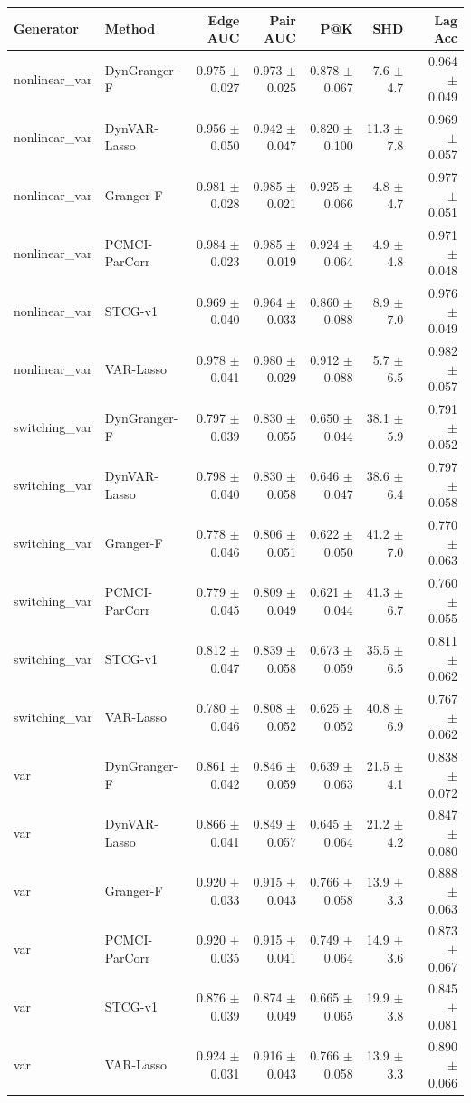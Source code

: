 \begin{tabular}{llrrrrr}
\toprule
Generator & Method & Edge AUC & Pair AUC & P@K & SHD & Lag Acc \\
\midrule
nonlinear_var & DynGranger-F & 0.975 $\pm$ 0.027 & 0.973 $\pm$ 0.025 & 0.878 $\pm$ 0.067 & 7.6 $\pm$ 4.7 & 0.964 $\pm$ 0.049 \\
nonlinear_var & DynVAR-Lasso & 0.956 $\pm$ 0.050 & 0.942 $\pm$ 0.047 & 0.820 $\pm$ 0.100 & 11.3 $\pm$ 7.8 & 0.969 $\pm$ 0.057 \\
nonlinear_var & Granger-F & 0.981 $\pm$ 0.028 & 0.985 $\pm$ 0.021 & 0.925 $\pm$ 0.066 & 4.8 $\pm$ 4.7 & 0.977 $\pm$ 0.051 \\
nonlinear_var & PCMCI-ParCorr & 0.984 $\pm$ 0.023 & 0.985 $\pm$ 0.019 & 0.924 $\pm$ 0.064 & 4.9 $\pm$ 4.8 & 0.971 $\pm$ 0.048 \\
nonlinear_var & STCG-v1 & 0.969 $\pm$ 0.040 & 0.964 $\pm$ 0.033 & 0.860 $\pm$ 0.088 & 8.9 $\pm$ 7.0 & 0.976 $\pm$ 0.049 \\
nonlinear_var & VAR-Lasso & 0.978 $\pm$ 0.041 & 0.980 $\pm$ 0.029 & 0.912 $\pm$ 0.088 & 5.7 $\pm$ 6.5 & 0.982 $\pm$ 0.057 \\
switching_var & DynGranger-F & 0.797 $\pm$ 0.039 & 0.830 $\pm$ 0.055 & 0.650 $\pm$ 0.044 & 38.1 $\pm$ 5.9 & 0.791 $\pm$ 0.052 \\
switching_var & DynVAR-Lasso & 0.798 $\pm$ 0.040 & 0.830 $\pm$ 0.058 & 0.646 $\pm$ 0.047 & 38.6 $\pm$ 6.4 & 0.797 $\pm$ 0.058 \\
switching_var & Granger-F & 0.778 $\pm$ 0.046 & 0.806 $\pm$ 0.051 & 0.622 $\pm$ 0.050 & 41.2 $\pm$ 7.0 & 0.770 $\pm$ 0.063 \\
switching_var & PCMCI-ParCorr & 0.779 $\pm$ 0.045 & 0.809 $\pm$ 0.049 & 0.621 $\pm$ 0.044 & 41.3 $\pm$ 6.7 & 0.760 $\pm$ 0.055 \\
switching_var & STCG-v1 & 0.812 $\pm$ 0.047 & 0.839 $\pm$ 0.058 & 0.673 $\pm$ 0.059 & 35.5 $\pm$ 6.5 & 0.811 $\pm$ 0.062 \\
switching_var & VAR-Lasso & 0.780 $\pm$ 0.046 & 0.808 $\pm$ 0.052 & 0.625 $\pm$ 0.052 & 40.8 $\pm$ 6.9 & 0.767 $\pm$ 0.062 \\
var & DynGranger-F & 0.861 $\pm$ 0.042 & 0.846 $\pm$ 0.059 & 0.639 $\pm$ 0.063 & 21.5 $\pm$ 4.1 & 0.838 $\pm$ 0.072 \\
var & DynVAR-Lasso & 0.866 $\pm$ 0.041 & 0.849 $\pm$ 0.057 & 0.645 $\pm$ 0.064 & 21.2 $\pm$ 4.2 & 0.847 $\pm$ 0.080 \\
var & Granger-F & 0.920 $\pm$ 0.033 & 0.915 $\pm$ 0.043 & 0.766 $\pm$ 0.058 & 13.9 $\pm$ 3.3 & 0.888 $\pm$ 0.063 \\
var & PCMCI-ParCorr & 0.920 $\pm$ 0.035 & 0.915 $\pm$ 0.041 & 0.749 $\pm$ 0.064 & 14.9 $\pm$ 3.6 & 0.873 $\pm$ 0.067 \\
var & STCG-v1 & 0.876 $\pm$ 0.039 & 0.874 $\pm$ 0.049 & 0.665 $\pm$ 0.065 & 19.9 $\pm$ 3.8 & 0.845 $\pm$ 0.081 \\
var & VAR-Lasso & 0.924 $\pm$ 0.031 & 0.916 $\pm$ 0.043 & 0.766 $\pm$ 0.058 & 13.9 $\pm$ 3.3 & 0.890 $\pm$ 0.066 \\
\bottomrule
\end{tabular}
